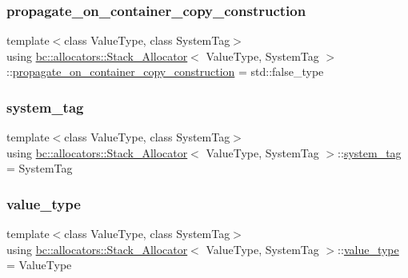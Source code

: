 \subsubsection{\texorpdfstring{propagate\+\_\+on\+\_\+container\+\_\+copy\+\_\+construction}{propagate\_on\_container\_copy\_construction}}
{\footnotesize\ttfamily template$<$class Value\+Type, class System\+Tag$>$ \\
using \hyperlink{classbc_1_1allocators_1_1Stack__Allocator}{bc\+::allocators\+::\+Stack\+\_\+\+Allocator}$<$ Value\+Type, System\+Tag $>$\+::\hyperlink{classbc_1_1allocators_1_1Stack__Allocator_a0ee5d61459babc228fbb10b3a88c8973}{propagate\+\_\+on\+\_\+container\+\_\+copy\+\_\+construction} =  std\+::false\+\_\+type}

\mbox{\label{classbc_1_1allocators_1_1Stack__Allocator_ad3a23f4b9643e115001b9e1beed650a0}} 
\subsubsection{\texorpdfstring{system\+\_\+tag}{system\_tag}}
{\footnotesize\ttfamily template$<$class Value\+Type, class System\+Tag$>$ \\
using \hyperlink{classbc_1_1allocators_1_1Stack__Allocator}{bc\+::allocators\+::\+Stack\+\_\+\+Allocator}$<$ Value\+Type, System\+Tag $>$\+::\hyperlink{classbc_1_1allocators_1_1Stack__Allocator_ad3a23f4b9643e115001b9e1beed650a0}{system\+\_\+tag} =  System\+Tag}

\mbox{\label{classbc_1_1allocators_1_1Stack__Allocator_a67c90d1cfb44c86aad7aebddc3401b7e}} 
\subsubsection{\texorpdfstring{value\+\_\+type}{value\_type}}
{\footnotesize\ttfamily template$<$class Value\+Type, class System\+Tag$>$ \\
using \hyperlink{classbc_1_1allocators_1_1Stack__Allocator}{bc\+::allocators\+::\+Stack\+\_\+\+Allocator}$<$ Value\+Type, System\+Tag $>$\+::\hyperlink{classbc_1_1allocators_1_1Stack__Allocator_a67c90d1cfb44c86aad7aebddc3401b7e}{value\+\_\+type} =  Value\+Type}



